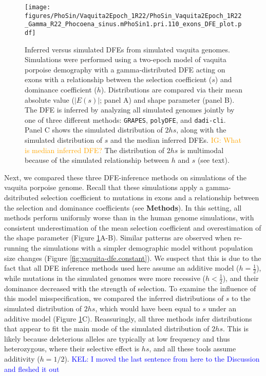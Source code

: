 \documentclass[hidelinks]{article}
\newcommand{\polydfe}{\texttt{polyDFE}\xspace}
\newcommand{\dadicli}{\texttt{dadi-cli}\xspace}
\newcommand{\grapes}{\texttt{GRAPES}\xspace}
\newcommand{\kelcomment}[1]{\textcolor{blue}{KEL: #1}}
\newcommand{\igcomment}[1]{\textcolor{orange}{IG: #1}}
\begin{document}
    


    \begin{figure}
        \centering
        \texttt{[image: figures/PhoSin/Vaquita2Epoch\_1R22/PhoSin\_Vaquita2Epoch\_1R22\_Gamma\_R22\_Phocoena\_sinus.mPhoSin1.pri.110\_exons\_DFE\_plot.pdf]}
        \caption{
        \label{fig:vaquita-dfe}
        Inferred versus simulated DFEs from simulated vaquita genomes.
        Simulations were performed using a two-epoch model of vaquita porpoise demography with a gamma-distributed DFE
        acting on exons with a relationship between the selection coefficient ($s$) and dominance coefficient ($h$). 
        Distributions are compared via their mean absolute value ($\lvert E(s) \rvert $; panel A) and shape parameter (panel B).
        The DFE is inferred by analyzing all simulated genomes jointly by one of three different methods:
        \grapes, \polydfe, and \dadicli.
        Panel C shows the simulated distribution of $2 h s$,
        along with the simulated distribution of $s$ and the median inferred DFEs. \igcomment{What is median inferred DFE?}
        The distribution of $2 h s$ is multimodal because of the simulated relationship between $h$ and $s$ (see text).
        }
    \end{figure}
    
    Next, we compared these three DFE-inference methods on simulations of the vaquita porpoise genome.
    Recall that these simulations apply a gamma-dsitributed selection coefficient to mutations in exons
    and a relationship between the selection and dominance coefficients (see \textbf{Methods}).
    In this setting, all methods perform uniformly worse than in the human genome simulations,
    with consistent underestimation of the mean selection coefficient    
    and overestimation of the shape parameter (Figure \ref{fig:vaquita-dfe}A-B). 
    Similar patterns are observed when re-running the simulations with a simpler demographic model
    without population size changes (Figure \ref{fig:vaquita-dfe.constant}).
    We suspect that this is due to the fact that all DFE inference methods used here assume an additive model ($h = \frac{1}{2}$),
    while mutations in the simulated genomes were more recessive ($h < \frac{1}{2}$), and their dominance decreased with the strength of selection. 
    To examine the influence of this model misspecification, we compared the inferred distributions of $s$ to the 
    simulated distribution of $2hs$, which would have been equal to $s$ under an additive model (Figure \ref{fig:vaquita-dfe}C).
    Reassuringly, all three methods infer distributions that appear to fit the main mode of the simulated distribution of $2hs$.
    This is likely because deleterious alleles are typically at low frequency and thus heterozygous, 
    where their selective effect is $h s$, and all these tools assume additivity  ($h = 1/2$).
   \kelcomment{I moved the last sentence from here to the Discussion and fleshed it out} 
\end{document}
